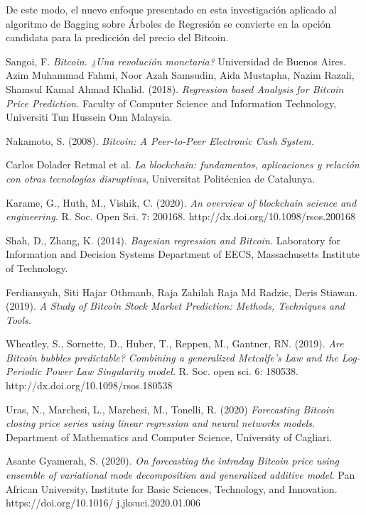 \documentclass[a4paper,12pt,twocolumn]{article}
\begin{document}
De este modo, el nuevo enfoque presentado en esta investigación aplicado al algoritmo de Bagging sobre Árboles de Regresión se convierte en la opción candidata para la predicción del precio del Bitcoin.



          
%
\begin{thebibliography}{99}

Sangoi, F.
{\em Bitcoin. ¿Una revolución monetaria?}
Universidad de Buenos Aires.
%
Azim Muhammad Fahmi, Noor Azah Samsudin, Aida Mustapha, 
Nazim Razali, Shamsul Kamal Ahmad Khalid. (2018).
{\em Regression based Analysis for Bitcoin Price Prediction.}
Faculty of Computer Science and Information Technology, Universiti Tun Hussein Onn Malaysia.

Nakamoto, S. (2008).
{\em Bitcoin: A Peer-to-Peer Electronic Cash System.}

Carlos Dolader Retmal et al.
{\em La blockchain: fundamentos, aplicaciones y relación con otras tecnologías disruptivas}, Universitat Politécnica de Catalunya.

Karame, G., Huth, M., Vishik, C. (2020).
{\em An overview of blockchain science and
engineering.} R. Soc. Open Sci. 7: 200168.
http://dx.doi.org/10.1098/rsos.200168


Shah, D., Zhang, K. (2014).
{\em Bayesian regression and Bitcoin.} 
Laboratory for Information and Decision Systems
Department of EECS, Massachusetts Institute of Technology.


Ferdiansyah, Siti Hajar Othmanb, Raja Zahilah Raja Md Radzic, Deris Stiawan. (2019).
{\em A Study of Bitcoin Stock Market Prediction: Methods, Techniques and Tools.} 

Wheatley, S., Sornette, D., Huber, T., Reppen, M., Gantner, RN. (2019). 
{\em Are Bitcoin bubbles predictable? Combining a generalized
Metcalfe’s Law and the Log-Periodic Power Law
Singularity model.} R. Soc. open sci. 6: 180538.
http://dx.doi.org/10.1098/rsos.180538

Uras, N., Marchesi, L., Marchesi, M., Tonelli, R. (2020)
{\em Forecasting Bitcoin closing price series using linear
regression and neural networks models}. Department of Mathematics and Computer Science, University of Cagliari.

Asante Gyamerah, S. (2020).
{\em On forecasting the intraday Bitcoin price using ensemble of variational
mode decomposition and generalized additive model}. Pan African University, Institute for Basic Sciences, Technology, and Innovation.
https://doi.org/10.1016/
j.jksuci.2020.01.006



\end{thebibliography}
\end{document}
